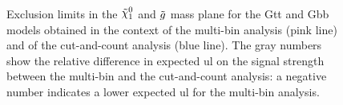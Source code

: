 \begin{figure}[htbp]
	\centering 
	\caption{Exclusion limits in the $\ninoone$ and $\tilde{g}$ mass plane
  		for the  Gtt and   Gbb models obtained
		in the context of the multi-bin analysis (pink line) and of the cut-and-count analysis (blue line). 
		The gray numbers show the relative difference in expected \gls{ul} on the signal strength 
		between the multi-bin and the cut-and-count analysis: a negative number indicates a lower expected \gls{ul} for the multi-bin analysis. }
	\label{fig:limits_GbbGtt_comp}
\end{figure}


